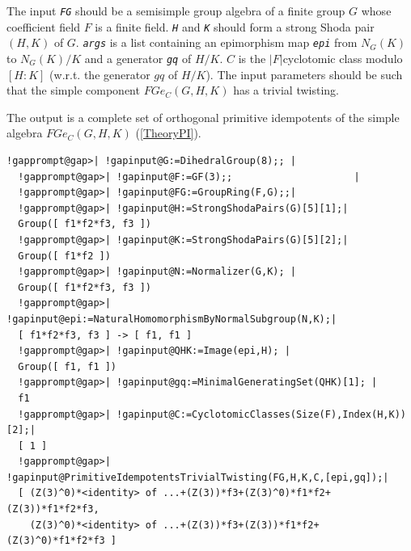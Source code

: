 \documentclass[a4paper,11pt]{report}
\begin{document}
{{{ The input \mbox{\texttt{\mdseries\slshape FG}} should be a semisimple group algebra of a finite group $G$ whose coefficient field $F$ is a finite field. \mbox{\texttt{\mdseries\slshape H}} and \mbox{\texttt{\mdseries\slshape K}} should form a strong Shoda pair $(H,K)$ of $G$. \mbox{\texttt{\mdseries\slshape args}} is a list containing an epimorphism map \mbox{\texttt{\mdseries\slshape epi}} from $N_G(K)$ to $N_G(K)/K$ and a generator \mbox{\texttt{\mdseries\slshape gq}} of $H/K$. $C$ is the $|F|$\texttt{}cyclotomic class modulo $[H:K]$ (w.r.t. the generator $gq$ of $H/K$). The input parameters should be such that the simple component $FGe_C(G,H,K)$ has a trivial twisting. 

 The output is a complete set of orthogonal primitive idempotents of the simple
algebra $FGe_C(G,H,K)$ (\ref{TheoryPI}). 
\begin{Verbatim}[commandchars=!@|,fontsize=\small,frame=single,label=Example]
  !gapprompt@gap>| !gapinput@G:=DihedralGroup(8);; |
  !gapprompt@gap>| !gapinput@F:=GF(3);;                     |
  !gapprompt@gap>| !gapinput@FG:=GroupRing(F,G);;|
  !gapprompt@gap>| !gapinput@H:=StrongShodaPairs(G)[5][1];|
  Group([ f1*f2*f3, f3 ])
  !gapprompt@gap>| !gapinput@K:=StrongShodaPairs(G)[5][2];|
  Group([ f1*f2 ])
  !gapprompt@gap>| !gapinput@N:=Normalizer(G,K); |
  Group([ f1*f2*f3, f3 ])
  !gapprompt@gap>| !gapinput@epi:=NaturalHomomorphismByNormalSubgroup(N,K);|
  [ f1*f2*f3, f3 ] -> [ f1, f1 ]
  !gapprompt@gap>| !gapinput@QHK:=Image(epi,H); |
  Group([ f1, f1 ])
  !gapprompt@gap>| !gapinput@gq:=MinimalGeneratingSet(QHK)[1]; |
  f1
  !gapprompt@gap>| !gapinput@C:=CyclotomicClasses(Size(F),Index(H,K))[2];|
  [ 1 ]
  !gapprompt@gap>| !gapinput@PrimitiveIdempotentsTrivialTwisting(FG,H,K,C,[epi,gq]);|
  [ (Z(3)^0)*<identity> of ...+(Z(3))*f3+(Z(3)^0)*f1*f2+(Z(3))*f1*f2*f3, 
    (Z(3)^0)*<identity> of ...+(Z(3))*f3+(Z(3))*f1*f2+(Z(3)^0)*f1*f2*f3 ]
\end{Verbatim}
 }

 }

 }

    
\end{document}
